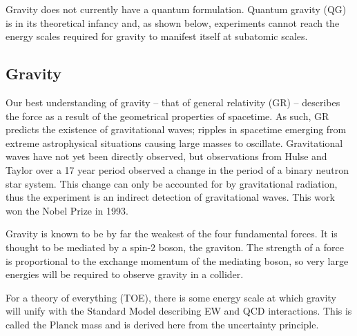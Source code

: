 Gravity does not currently have a quantum formulation. Quantum gravity (QG) is in its theoretical infancy and, as shown below, experiments cannot reach the energy scales required for gravity to manifest itself at subatomic scales.

\subsection{Gravity}
Our best understanding of gravity -- that of general relativity (GR) -- describes the force as a result of the geometrical properties of spacetime. As such, GR predicts the existence of gravitational waves; ripples in spacetime emerging from extreme astrophysical situations causing large masses to oscillate. Gravitational waves have not yet been directly observed, but observations from Hulse and Taylor over a 17 year period observed a change in the period of a binary neutron star system. This change can only be accounted for by gravitational radiation, thus the experiment is an indirect detection of gravitational waves. This work won the Nobel Prize in 1993.

Gravity is known to be by far the weakest of the four fundamental forces. It is thought to be mediated by a spin-2 boson, the graviton. The strength of a force is proportional to the exchange momentum of the mediating boson, so very large energies will be required to observe gravity in a collider.

For a theory of everything (TOE), there is some energy scale at which gravity will unify with the Standard Model describing EW and QCD interactions. This is called the Planck mass and is derived here from the uncertainty principle.


